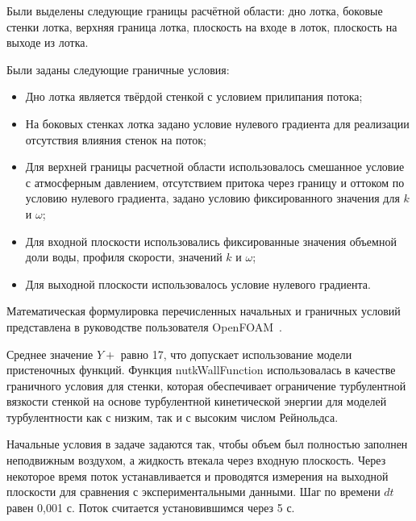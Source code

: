\documentclass[mathematics,article,accept,pdftex,moreauthors]{Definitions/mdpi}
\begin{document}
Были выделены следующие границы расчётной области: дно лотка, боковые стенки лотка, верхняя граница лотка, плоскость на входе в лоток, плоскость на выходе из лотка.

Были заданы следующие граничные условия:
\begin{itemize}
	\item Дно лотка является твёрдой стенкой с условием прилипания потока; 
	\item На боковых стенках лотка задано условие нулевого градиента для реализации отсутствия влияния стенок на поток;
	\item Для верхней границы расчетной области использовалось смешанное условие с атмосферным давлением, отсутствием притока через границу и оттоком по условию нулевого градиента, задано условию фиксированного значения для $k$ и $\omega$;
	\item Для входной плоскости использовались фиксированные значения объемной доли воды, профиля скорости, значений $k$ и $\omega$;
	\item Для выходной плоскости использовалось условие нулевого градиента.
\end{itemize}

Математическая формулировка перечисленных начальных и граничных условий представлена в руководстве пользователя OpenFOAM~\cite{OFUG}.

Среднее значение $Y+$ равно 17, что допускает использование модели пристеночных функций. Функция nutkWallFunction использовалась в качестве граничного условия для стенки, которая обеспечивает ограничение турбулентной вязкости стенкой на основе турбулентной кинетической энергии для моделей турбулентности как с низким, так и с высоким числом Рейнольдса.

Начальные условия в задаче задаются так, чтобы объем был полностью заполнен неподвижным воздухом, а жидкость втекала через входную плоскость. Через некоторое время поток устанавливается и проводятся измерения на выходной плоскости для сравнения с экспериментальными данными. Шаг по времени $dt$ равен 0,001 с. Поток считается установившимся через 5 с.







\end{document}
